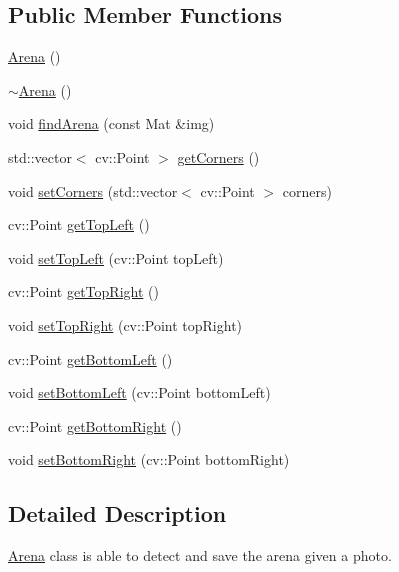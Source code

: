 \subsection*{Public Member Functions}
\begin{DoxyCompactItemize}
\item 
\mbox{\hyperlink{class_arena_a74f105bc709d4728fb07f1984abfd345}{Arena}} ()
\item 
\mbox{\hyperlink{class_arena_ae21b399e9e3f6b8ac4ecc44d7d1667fc}{$\sim$\+Arena}} ()
\item 
void \mbox{\hyperlink{class_arena_aa37acdf43108ab0da04b77bbf79c2f7d}{find\+Arena}} (const Mat \&img)
\item 
std\+::vector$<$ cv\+::\+Point $>$ \mbox{\hyperlink{class_arena_a67171d93c7aff0f9d8bd3ee0596e9033}{get\+Corners}} ()
\item 
void \mbox{\hyperlink{class_arena_a7f822f33ff5810d4d266183e7606c0fe}{set\+Corners}} (std\+::vector$<$ cv\+::\+Point $>$ corners)
\item 
cv\+::\+Point \mbox{\hyperlink{class_arena_ae7219e6d298213627a0c671e5c5f9536}{get\+Top\+Left}} ()
\item 
void \mbox{\hyperlink{class_arena_a7ab570cb7821df75c6da9af6491be034}{set\+Top\+Left}} (cv\+::\+Point top\+Left)
\item 
cv\+::\+Point \mbox{\hyperlink{class_arena_aa417bc8757d66038038ac3f6a9d44860}{get\+Top\+Right}} ()
\item 
void \mbox{\hyperlink{class_arena_a82c7fa04e8acf52f6edecc1ee1c38001}{set\+Top\+Right}} (cv\+::\+Point top\+Right)
\item 
cv\+::\+Point \mbox{\hyperlink{class_arena_afdd88e341c385561eafbc73e90e08404}{get\+Bottom\+Left}} ()
\item 
void \mbox{\hyperlink{class_arena_ac546db1983967fcc195369c8a0f1f9e5}{set\+Bottom\+Left}} (cv\+::\+Point bottom\+Left)
\item 
cv\+::\+Point \mbox{\hyperlink{class_arena_ac62870a7bfa41baa7d38c4f7373cf3f5}{get\+Bottom\+Right}} ()
\item 
void \mbox{\hyperlink{class_arena_a2207ae5feab0d9ef8a19ab46fdd8685c}{set\+Bottom\+Right}} (cv\+::\+Point bottom\+Right)
\end{DoxyCompactItemize}


\subsection{Detailed Description}
\mbox{\hyperlink{class_arena}{Arena}} class is able to detect and save the arena given a photo. 

